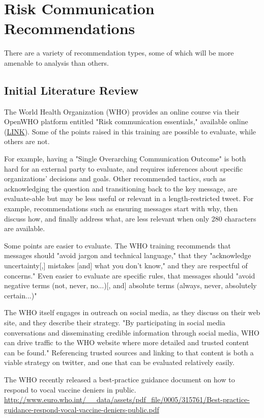 \documentclass{article}
\begin{document}
\section{Risk Communication Recommendations}

There are a variety of recommendation types, some of which will be more amenable to analysis than others.

\subsection{Initial Literature Review}
The World Health Organization (WHO) provides an online course via their OpenWHO platform entitled "Risk communication essentials," available online (\href{https://openwho.org/courses/risk-communication}{LINK})\cite{OpenWHORiskComm2017}. Some of the points raised in this training are possible to evaluate, while others are not. 
 
For example, having a "Single Overarching Communication Outcome" is both hard for an external party to evaluate, and requires inferences about specific organizations' decisions and goals. Other recommended tactics, such as acknowledging the question and transitioning back to the key message, are evaluate-able but may be less useful or relevant in a length-restricted tweet. For example, recommendations such as ensuring messages start with why, then discuss how, and finally address what, are less relevant when only 280 characters are available.

Some points are easier to evaluate. The WHO training recommends that messages should "avoid jargon and technical language," that they "acknowledge uncertainty[,] mistakes [and] what you don't know," and they are respectful of concerns." Even easier to evaluate are specific rules, that messages should "avoid negative terms (not, never, no...)[, and] absolute terms (always, never, absolutely certain...)"

The WHO itself engages in outreach on social media, as they discuss on their web site\cite{WHOWebSocialMedia}, and they describe their strategy. "By participating in social media conversations and disseminating credible information through social media, WHO can drive traffic to the WHO website where more detailed and trusted content can be found." Referencing trusted sources and linking to that content is both a viable strategy on twitter, and one that can be evaluated relatively easily.

The WHO recently released a best-practice guidance document on how to respond to vocal vaccine deniers in public. \url{http://www.euro.who.int/__data/assets/pdf_file/0005/315761/Best-practice-guidance-respond-vocal-vaccine-deniers-public.pdf}
\end{document}
